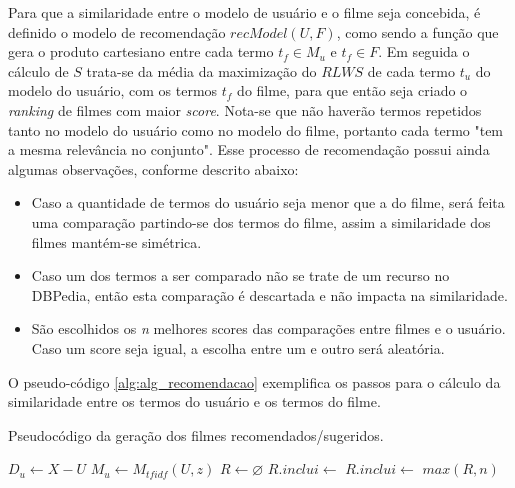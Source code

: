 Para que a similaridade entre o modelo de usuário e o filme seja concebida, é definido o modelo de recomendação $recModel(U, F)$, como sendo a função que gera o produto cartesiano entre cada termo $t_f \in M_u$ e $t_f \in F$. Em seguida o cálculo de $S$ trata-se da média da maximização do $RLWS$ de cada termo $t_u$ do modelo do usuário, com os termos $t_f$ do filme, para que então seja criado o \textit{ranking} de filmes com maior \textit{score}. Nota-se que não haverão termos repetidos tanto no modelo do usuário como no modelo do filme, portanto cada termo "tem a mesma relevância no conjunto". Esse processo de recomendação possui ainda algumas observações, conforme descrito abaixo:

\begin{itemize}
	\item{Caso a quantidade de termos do usuário seja menor que a do filme, será feita uma comparação partindo-se dos termos do filme, assim a similaridade dos filmes mantém-se simétrica.}
	\item{Caso um dos termos a ser comparado não se trate de um recurso no DBPedia, então esta comparação é descartada e não impacta na similaridade.}
	\item{São escolhidos os \textit{n} melhores scores das comparações entre filmes e o usuário. Caso um score seja igual, a escolha entre um e outro será aleatória.}
\end{itemize}

O pseudo-código \ref{alg:alg_recomendacao} exemplifica os passos para o cálculo da similaridade entre os termos do usuário e os termos do filme.

\begin{algorithm}
	\caption{Pseudocódigo da geração dos filmes recomendados/sugeridos.}
    \begin{algorithmic}[1]
        	\State $D_u \gets X - U$
        	\State $M_u \gets M_{tfidf}(U, z)$
        	\State $R \gets \varnothing$
        			\State $R.inclui \gets$ 
				\Else
					\State $R.inclui \gets$ 
        		\EndIf
        	\EndFor
        	\Return $max(R, n)$
        \EndFunction
    \end{algorithmic}
\label{alg:alg_recomendacao}
\end{algorithm}

